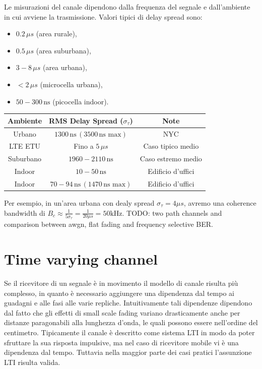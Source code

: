 Le misurazioni del canale dipendono dalla frequenza del segnale e dall'ambiente in cui avviene la trasmissione.
Valori tipici di delay spread sono:

\begin{itemize}
    \item $0.2 \, \mu s$ (area rurale),
    \item $0.5 \, \mu s$ (area suburbana),
    \item $3-8 \, \mu s$ (area urbana),
    \item $<2 \, \mu s$ (microcella urbana),
    \item $50-300 \, \text{ns}$ (picocella indoor).
\end{itemize}

\begin{center}
    \begin{tabular}{|c|c|c|}
        \hline
        \textbf{Ambiente} & \textbf{RMS Delay Spread ($\sigma_\tau$)}       & \textbf{Note}      \\
        \hline
        Urbano            & $1300 \, \text{ns} \, (3500 \, \text{ns max})$  & NYC                \\
        LTE ETU           & Fino a $5 \, \mu s$                             & Caso tipico medio  \\
        Suburbano         & $1960-2110 \, \text{ns}$                        & Caso estremo medio \\
        Indoor            & $10-50 \, \text{ns}$                            & Edificio d'uffici  \\
        Indoor            & $70-94 \, \text{ns} \, (1470 \, \text{ns max})$ & Edificio d'uffici  \\
        \hline
    \end{tabular}
\end{center}


Per esempio, in un'area urbana con dealy spread $\sigma_\tau = 4 \mu s$, avremo una coherence bandwidth di $B_c \approx \frac{1}{5 \sigma_\tau} = \frac{1}{20 \mu s} = 50 \text{kHz}$.
TODO: two path channels and comparison between awgn, flat fading and frequency selective BER.
\section*{Time varying channel}
Se il ricevitore di un segnale è in movimento il modello di canale risulta più complesso, in quanto è necessario aggiungere una dipendenza dal tempo ai guadagni e alle fasi alle varie repliche.
Intuitivamente tali dipendenze dipendono dal fatto che gli effetti di small scale fading variano drasticamente anche per distanze paragonabili alla lunghezza d'onda, le quali possono essere nell'ordine del centimetro.
Tipicamente il canale è descritto come sistema LTI in modo da poter sfruttare la sua risposta impulsive, ma nel caso di ricevitore mobile vi è una dipendenza dal tempo.
Tuttavia nella maggior parte dei casi pratici l'assunzione LTI risulta valida.

